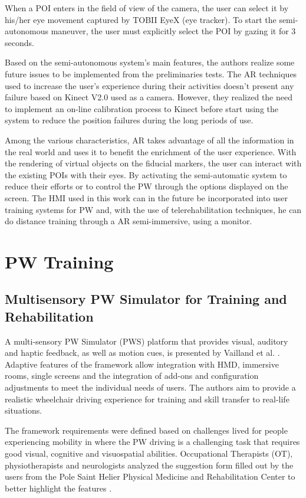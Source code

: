 When a POI enters in the field of view of the camera, the user can select it by his/her eye movement captured by TOBII EyeX (eye tracker). To start the semi-autonomous maneuver, the user must explicitly select the POI by gazing it for 3 seconds. 

Based on the semi-autonomous system's main features, the authors realize some future issues to be implemented from the preliminaries tests. The AR techniques used to increase the user's experience during their activities doesn't present any failure based on Kinect V2.0 used as a camera. However,  they realized the need to implement an on-line calibration process to Kinect before start using the  system to reduce the position failures during the long periods of use. 

Among the various characteristics, AR takes advantage of all the information in the real world and uses it to benefit the enrichment of the user experience. With the rendering of virtual objects on the fiducial markers, the user can interact with the existing POIs with their eyes.  By activating the semi-automatic system to reduce their efforts or to control the PW through the options displayed on the screen. The HMI used in this work can in the future be incorporated into user training systems for PW and, with the use of telerehabilitation techniques, he can do distance training through a AR semi-immersive, using a monitor.

\section{PW Training}
\label{sec:pwTraining}
\subsection{Multisensory PW Simulator for Training and Rehabilitation}
A multi-sensory PW Simulator (PWS)  platform that provides visual, auditory and haptic feedback, as well as motion cues, is presented by Vailland et al. \cite{vailland2019}. Adaptive features of the framework allow integration with HMD, immersive rooms, single screens and the integration of add-ons and configuration adjustments to meet the individual needs of users. The authors aim to provide a realistic wheelchair driving experience for training and skill transfer to real-life situations.

The framework requirements were defined based on challenges lived for people experiencing mobility in where the PW driving is a challenging task that requires good visual, cognitive and visuospatial abilities. Occupational Therapists (OT), physiotherapists and neurologists analyzed the suggestion form filled out by the users from the Pole Saint Helier Physical Medicine and Rehabilitation Center to better highlight the features \cite{vailland2019}.

